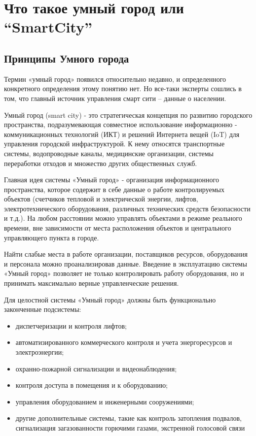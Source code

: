 
\section{Что такое умный город или “SmartCity”}

\subsection{Принципы Умного города}

Термин «умный город» появился относительно недавно, и определенного конкретного определения этому понятию нет. Но все-таки  эксперты сошлись в том, что главный источник управления смарт сити – данные о населении. 

Умный город (smart city) - это стратегическая концепция по развитию городского пространства, подразумевающая совместное использование информационно - коммуникационных технологий (ИКТ) и решений Интернета вещей (IoT) для управления городской инфраструктурой. К нему относятся транспортные системы, водопроводные каналы, медицинские организации, системы переработки отходов и множество других общественных служб. 

Главная идея системы «Умный город» - организация информационного пространства, которое содержит в себе данные о работе контролируемых объектов (счетчиков тепловой и электрической энергии, лифтов, электротехнического оборудования, различных технических средств безопасности и т.д.). На любом расстоянии можно управлять объектами в режиме реального времени, вне зависимости от места расположения объектов и центрального управляющего пункта в городе.\cite{NK}

Найти слабые места в работе организации, поставщиков ресурсов, оборудования и персонала можно проанализировав данные. Введение в эксплуатацию системы «Умный город» позволяет не только контролировать работу оборудования, но и принимать максимально верные управленческие решения. 

Для целостной системы «Умный город» должны быть функционально законченные подсистемы:
\begin{itemize}
 \item диспетчеризации и контроля лифтов; 
 \item автоматизированного коммерческого контроля и учета энергоресурсов и электроэнергии; 
 \item охранно-пожарной сигнализации и видеонаблюдения; 
 \item контроля доступа в помещения и к оборудованию; 
 \item управления оборудованием и инженерными сооружениями; 
 \item другие дополнительные системы, такие как контроль затопления подвалов, сигнализация загазованности горючими газами, экстренной голосовой связи
\end{itemize}
 
